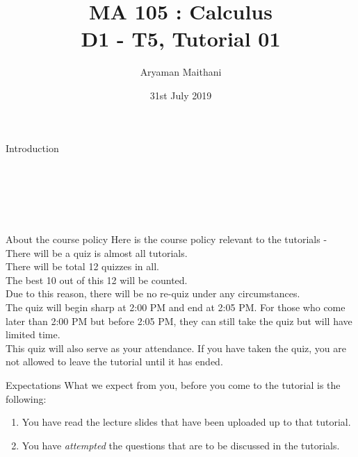 \documentclass[pdf, aspectratio=169]{beamer}
\title{MA 105 : Calculus\\ D1 - T5, Tutorial 01}
\author{Aryaman Maithani}
\date[31-07-2019]{31st July 2019}
\institute[IITB]{IIT Bombay}
\begin{document}
\begin{frame}
    \titlepage
\end{frame}

\begin{frame}{Introduction}
    \\
    \\
    \\
    \\
    \\
    \\
\end{frame}
\begin{frame}{About the course policy}
    Here is the course policy relevant to the tutorials -\\
    There will be a quiz is almost all tutorials.\\
    There will be total 12 quizzes in all.\\
    The best 10 out of this 12 will be counted.\\
    Due to this reason, there will be no re-quiz under any circumstances.\\
    The quiz will begin sharp at 2:00 PM and end at 2:05 PM. For those who come later than 2:00 PM but before 2:05 PM, they can still take the quiz but will have limited time.\\
    This quiz will also serve as your attendance. If you have taken the quiz, you are not allowed to leave the tutorial until it has ended.
\end{frame}
\begin{frame}{Expectations}
    What we expect from you, before you come to the tutorial is the following:
    \begin{enumerate}
        \item You have read the lecture slides that have been uploaded up to that tutorial.
        \item You have \emph{attempted} the questions that are to be discussed in the tutorials.
    \end{enumerate}
\end{frame}
\end{document}
